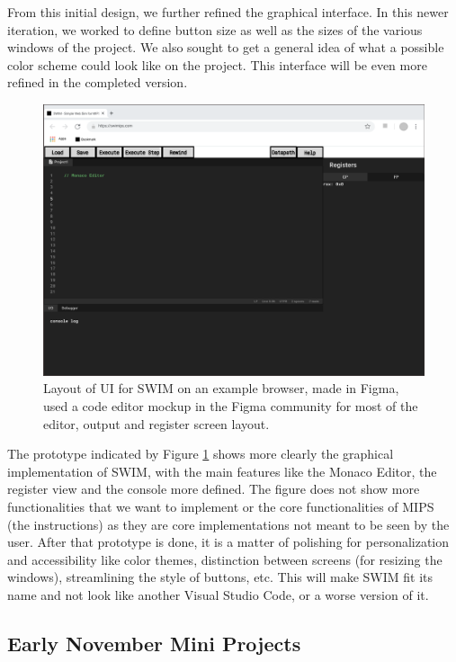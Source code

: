 \documentclass[
    paper=letter,
    parskip=half,
    fontsize=12pt,
    titlepage=firstiscover,
    toc=bibliography,
    numbers=endperiod
]{scrartcl}
\begin{document}
From this initial design, we further refined the graphical interface. In
this newer iteration, we worked to define button size as well as the
sizes of the various windows of the project. We also sought to get a
general idea of what a possible color scheme could look like on the
project. This interface will be even more refined in the completed
version.

\begin{figure}[H]
    \includegraphics[width=\textwidth]{new-ui-prototype}
    \caption{Layout of UI for SWIM on an example browser, made in Figma, used a code editor mockup in the Figma community for most of the editor, output and register screen layout.}
    \label{fig:new-ui-prototype}
\end{figure}

The prototype indicated by Figure \ref{fig:new-ui-prototype} shows more
clearly the graphical implementation of SWIM, with the main features
like the Monaco Editor, the register view and the console more defined.
The figure does not show more functionalities that we want to implement
or the core functionalities of MIPS (the instructions) as they are core
implementations not meant to be seen by the user. After that prototype
is done, it is a matter of polishing for personalization and
accessibility like color themes, distinction between screens (for
resizing the windows), streamlining the style of buttons, etc. This will
make SWIM fit its name and not look like another Visual Studio Code, or
a worse version of it.

\subsection{Early November Mini Projects}
\end{document}
